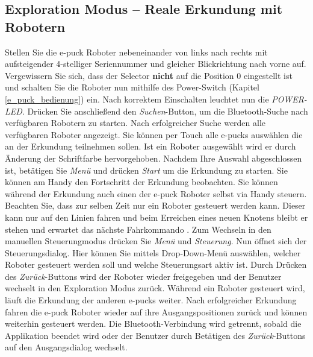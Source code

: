 \documentclass[10pt,a4paper]{article}
\begin{document}
	\subsection{Exploration Modus -- Reale Erkundung mit Robotern}
	\label{subsec:reale_erkundung}
		Stellen Sie die e-puck Roboter nebeneinander von links nach rechts mit aufsteigender 4-stelliger Seriennummer und gleicher Blickrichtung nach vorne auf. 
		Vergewissern Sie sich, dass der Selector \textbf{nicht} auf die Position 0	eingestellt ist und schalten Sie die Roboter nun mithilfe des Power-Switch (Kapitel 
		\ref{e_puck_bedienung}) ein. Nach korrektem Einschalten leuchtet nun die 
		\textit{POWER-LED}. Dr\"ucken Sie anschlie\ss end den \textit{Suchen}-Button, um die Bluetooth-Suche nach verf\"ugbaren Robotern zu starten. Nach 								erfolgreicher	Suche werden alle verf\"ugbaren Roboter angezeigt. Sie k\"onnen per Touch alle e-pucks ausw\"ahlen die an der Erkundung teilnehmen sollen. Ist 					ein Roboter ausgew\"ahlt wird er durch \"Anderung der Schriftfarbe hervorgehoben. Nachdem Ihre Auswahl abgeschlossen ist, bet\"atigen Sie \textit{Men\"u} 					und dr\"ucken  \textit{Start} um die Erkundung zu starten. Sie k\"onnen am Handy den Fortschritt der Erkundung beobachten. Sie k\"onnen w\"ahrend der
		Erkundung auch einen der e-puck Roboter selbst via Handy steuern. Beachten Sie, dass zur selben Zeit nur ein Roboter gesteuert werden kann. Dieser kann nur
		auf den  Linien fahren und beim Erreichen eines neuen Knotens bleibt er stehen und erwartet das n\"achste Fahrkommando . Zum Wechseln in den manuellen 
		Steuerungmodus dr\"ucken Sie \textit{Men\"u} und \textit{Steuerung}. Nun \"offnet sich der Steuerungsdialog. Hier k\"onnen Sie mittels Drop-Down-Men\"u 
		ausw\"ahlen, welcher Roboter gesteuert werden soll und welche Steuerungsart aktiv ist. Durch Dr\"ucken des \textit{Zur\"uck}-Buttons wird der Roboter wieder
		freigegeben und der Benutzer wechselt in den Exploration Modus zur\"uck. W\"ahrend ein Roboter gesteuert wird, l\"auft die Erkundung der anderen e-pucks
		weiter. Nach erfolgreicher Erkundung fahren die e-puck Roboter wieder auf ihre Ausgangspositionen zur\"uck und k\"onnen weiterhin gesteuert werden. Die
		Bluetooth-Verbindung wird getrennt, sobald die Applikation beendet wird oder der Benutzer durch Bet\"atigen des \textit{Zur\"uck}-Buttons auf den 
		Ausgangsdialog wechselt.
\end{document}
